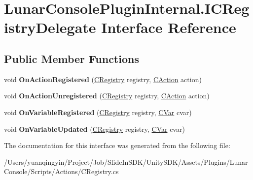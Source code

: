 \hypertarget{interface_lunar_console_plugin_internal_1_1_i_c_registry_delegate}{}\section{Lunar\+Console\+Plugin\+Internal.\+I\+C\+Registry\+Delegate Interface Reference}
\label{interface_lunar_console_plugin_internal_1_1_i_c_registry_delegate}
\subsection*{Public Member Functions}
\begin{DoxyCompactItemize}
\item 
\mbox{\label{interface_lunar_console_plugin_internal_1_1_i_c_registry_delegate_adf8633d1b48e5eba0fb77cc743a872f4}} 
void {\bfseries On\+Action\+Registered} (\mbox{\hyperlink{class_lunar_console_plugin_internal_1_1_c_registry}{C\+Registry}} registry, \mbox{\hyperlink{class_lunar_console_plugin_internal_1_1_c_action}{C\+Action}} action)
\item 
\mbox{\label{interface_lunar_console_plugin_internal_1_1_i_c_registry_delegate_a67909bc36633dd7e8cc16979f5044564}} 
void {\bfseries On\+Action\+Unregistered} (\mbox{\hyperlink{class_lunar_console_plugin_internal_1_1_c_registry}{C\+Registry}} registry, \mbox{\hyperlink{class_lunar_console_plugin_internal_1_1_c_action}{C\+Action}} action)
\item 
\mbox{\label{interface_lunar_console_plugin_internal_1_1_i_c_registry_delegate_a062defd13200234889230692f7e596ee}} 
void {\bfseries On\+Variable\+Registered} (\mbox{\hyperlink{class_lunar_console_plugin_internal_1_1_c_registry}{C\+Registry}} registry, \mbox{\hyperlink{class_lunar_console_plugin_1_1_c_var}{C\+Var}} cvar)
\item 
\mbox{\label{interface_lunar_console_plugin_internal_1_1_i_c_registry_delegate_ad315cb3dac129aed9cd590decd553ee7}} 
void {\bfseries On\+Variable\+Updated} (\mbox{\hyperlink{class_lunar_console_plugin_internal_1_1_c_registry}{C\+Registry}} registry, \mbox{\hyperlink{class_lunar_console_plugin_1_1_c_var}{C\+Var}} cvar)
\end{DoxyCompactItemize}


The documentation for this interface was generated from the following file\+:\begin{DoxyCompactItemize}
\item 
/\+Users/yuanqingyin/\+Project/\+Job/\+Slide\+In\+S\+D\+K/\+Unity\+S\+D\+K/\+Assets/\+Plugins/\+Lunar\+Console/\+Scripts/\+Actions/C\+Registry.\+cs\end{DoxyCompactItemize}
